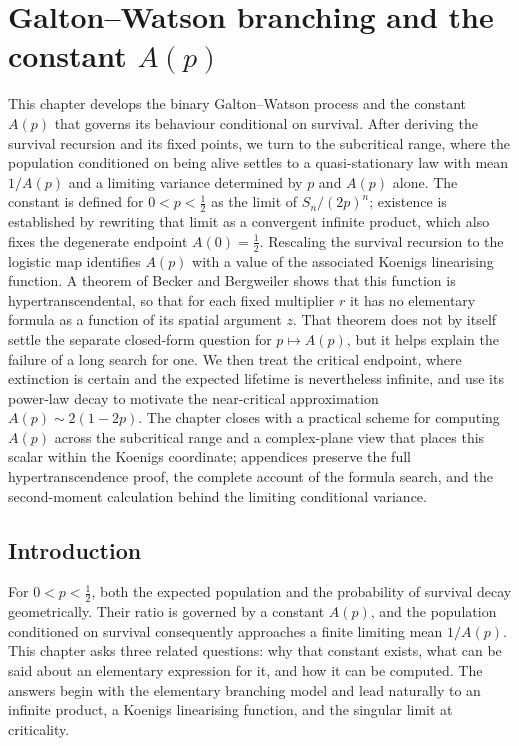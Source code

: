 \chapter[Galton--Watson branching and the constant $A(p)$]{Galton--Watson branching and the constant $A(p)$}
\label{gw:ch:galton-watson}

\begin{chapterabstract}
    \noindent
This chapter develops the binary Galton--Watson process and the constant $A(p)$
that governs its behaviour conditional on survival. After deriving the survival
recursion and its fixed points, we turn to the subcritical range, where the
population conditioned on being alive settles to a quasi-stationary law with mean
$1/A(p)$ and a limiting variance determined by $p$ and $A(p)$ alone. The constant
is defined for $0<p<\tfrac12$ as the limit of $S_n/(2p)^n$; existence is established
by rewriting that limit as a convergent infinite product, which also fixes the
degenerate endpoint $A(0)=\tfrac12$. Rescaling the survival recursion to the
logistic map identifies $A(p)$ with a value of the associated Koenigs linearising
function. A theorem of Becker and Bergweiler shows that this function is
hypertranscendental, so that for each fixed multiplier $r$ it has no elementary
formula as a function of its spatial argument $z$. That theorem does not by
itself settle the separate closed-form question for $p\mapsto A(p)$, but it helps
explain the failure of a long search for one. We then treat the critical endpoint, where extinction is certain
and the expected lifetime is nevertheless infinite, and use its power-law decay
to motivate the near-critical approximation $A(p)\sim2(1-2p)$. The chapter closes
with a practical scheme for computing $A(p)$ across the subcritical range and a
complex-plane view that places this scalar within the Koenigs coordinate;
appendices preserve the full hypertranscendence proof, the complete account of
the formula search, and the second-moment calculation behind the limiting
conditional variance.
\end{chapterabstract}

\section{Introduction}

For $0<p<\tfrac12$, both the expected population and the probability of survival
decay geometrically. Their ratio is governed by a constant $A(p)$, and the
population conditioned on survival consequently approaches a finite limiting mean
$1/A(p)$. This chapter asks three related questions: why that constant exists,
what can be said about an elementary expression for it, and how it can be
computed.
The answers begin with the elementary branching model and lead naturally to an
infinite product, a Koenigs linearising function, and the singular limit at
criticality.

